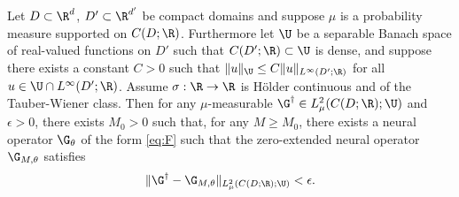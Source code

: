 \begin{theorem}
\label{thm:main_measurable}
Let \(D \subset \R^d\), \(D' \subset \R^{d'}\) be compact domains and suppose \(\mu\) is a probability measure supported on \(C(D;\R)\). Furthermore let \(\U\) be a separable Banach space of real-valued functions on \(D'\) such that \(C(D';\R) \subset \U\) is dense, and suppose there exists a constant \(C > 0\) such that \(\|u\|_{\U} \leq C \|u\|_{L^\infty (D';\R)}\) for all \(u \in \U \cap L^\infty(D';\R)\). Assume \(\sigma : \R \to \R\) is  H{\"o}lder continuous and of the Tauber-Wiener class. Then for any \(\mu\)-measurable \(\G^\dagger \in L^2_\mu(C(D;\R); \U)\) and \(\epsilon > 0\), there exists \(M_0 > 0\) such that, for any \(M \geq M_0\),
there exists a neural operator \(\G_{\theta}\) of the form \eqref{eq:F} such that the zero-extended neural operator \(\G_{M,\theta}\) satisfies
\[\|\G^\dagger - \G_{M,\theta} \|_{L^2_\mu (C(D;\R);\U)} < \epsilon.\]
\end{theorem}
